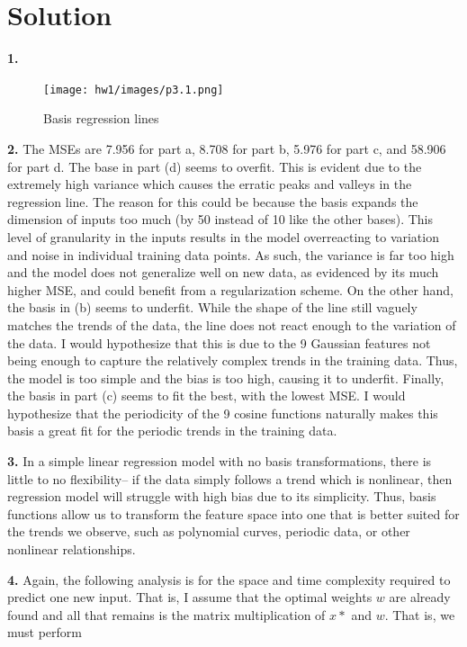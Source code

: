 \documentclass[submit]{../harvardml}
\newenvironment{solution}
  {\color{black}\section*{Solution}}
{}
\begin{document}
\newpage 
\begin{solution}
    \textbf{1.} \begin{figure}[H]
        \centering
        \texttt{[image: hw1/images/p3.1.png]}
        \caption{Basis regression lines}
        \label{fig:enter-label}
    \end{figure}
    \begin{tcolorbox}
        \textbf{2.} The MSEs are 7.956 for part a, 8.708 for part b, 5.976 for part c, and 58.906 for part d. The base in part (d) seems to overfit. This is evident due to the extremely high variance which causes the erratic peaks and valleys in the regression line. The reason for this could be because the basis expands the dimension of inputs too much (by 50 instead of 10 like the other bases). This level of granularity in the inputs results in the model overreacting to variation and noise in individual training data points. As such, the variance is far too high and the model does not generalize well on new data, as evidenced by its much higher MSE, and could benefit from a regularization scheme. On the other hand, the basis in (b) seems to underfit. While the shape of the line still vaguely matches the trends of the data, the line does not react enough to the variation of the data. I would hypothesize that this is due to the 9 Gaussian features not being enough to capture the relatively complex trends in the training data. Thus, the model is too simple and the bias is too high, causing it to underfit. Finally, the basis in part (c) seems to fit the best, with the lowest MSE. I would hypothesize that the periodicity of the 9 cosine functions naturally makes this basis a great fit for the periodic trends in the training data. 
    \end{tcolorbox}
    \begin{tcolorbox}
        \textbf{3.} In a simple linear regression model with no basis transformations, there is little to no flexibility-- if the data simply follows a trend which is nonlinear, then regression model will struggle with high bias due to its simplicity. Thus, basis functions allow us to transform the feature space into one that is better suited for the trends we observe, such as polynomial curves, periodic data, or other nonlinear relationships.
    \end{tcolorbox}
    \begin{tcolorbox}
        \textbf{4.} Again, the following analysis is for the space and time complexity required to predict one new input. That is, I assume that the optimal weights $w$ are already found and all that remains is the matrix multiplication of $x*$ and $w$. That is, we must perform

\end{tcolorbox}
\end{solution}
\end{document}
